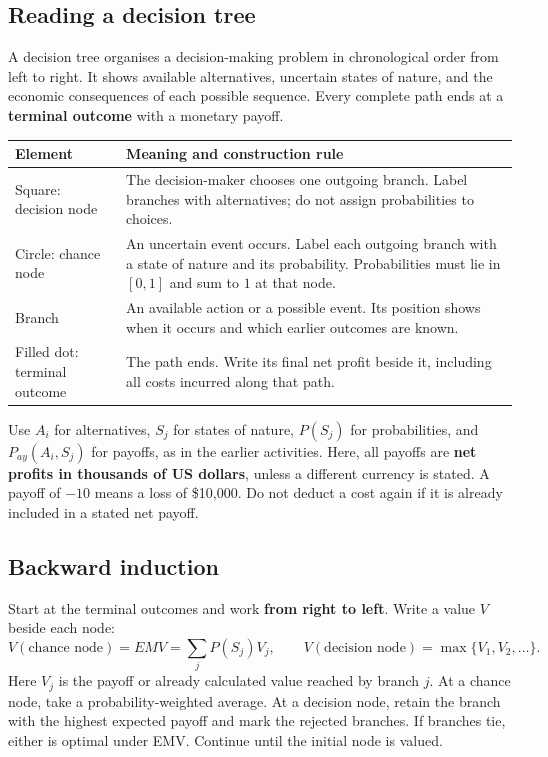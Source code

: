 \subsection{Reading a decision tree}
A decision tree organises a decision-making problem in chronological order from left to right. It shows available alternatives, uncertain states of nature, and the economic consequences of each possible sequence. Every complete path ends at a \textbf{terminal outcome} with a monetary payoff.
\begin{center}
\begin{tabularx}{\textwidth}{@{}lX@{}}\toprule
Element & Meaning and construction rule\\\midrule
Square: decision node & The decision-maker chooses one outgoing branch. Label branches with alternatives; do not assign probabilities to choices.\\
Circle: chance node & An uncertain event occurs. Label each outgoing branch with a state of nature and its probability. Probabilities must lie in $[0,1]$ and sum to $1$ at that node.\\
Branch & An available action or a possible event. Its position shows when it occurs and which earlier outcomes are known.\\
Filled dot: terminal outcome & The path ends. Write its final net profit beside it, including all costs incurred along that path.\\\bottomrule
\end{tabularx}
\end{center}
Use $A_i$ for alternatives, $S_j$ for states of nature, $P(S_j)$ for probabilities, and $P_{ay}(A_i,S_j)$ for payoffs, as in the earlier activities. Here, all payoffs are \textbf{net profits in thousands of US dollars}, unless a different currency is stated. A payoff of $-10$ means a loss of \$10,000. Do not deduct a cost again if it is already included in a stated net payoff.

\subsection{Backward induction}
Start at the terminal outcomes and work \textbf{from right to left}. Write a value $V$ beside each node:
\[
V(\text{chance node})=EMV=\sum_j P(S_j)V_j,
\qquad V(\text{decision node})=\max\{V_1,V_2,\ldots\}.
\]
Here $V_j$ is the payoff or already calculated value reached by branch $j$. At a chance node, take a probability-weighted average. At a decision node, retain the branch with the highest expected payoff and mark the rejected branches. If branches tie, either is optimal under EMV. Continue until the initial node is valued.

